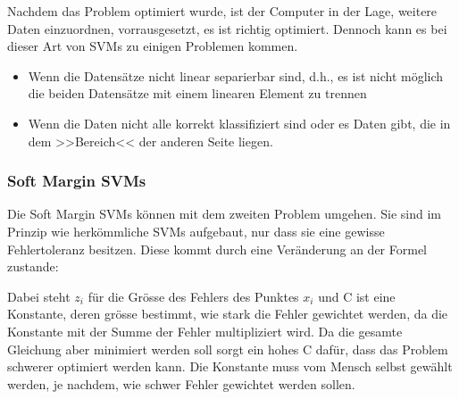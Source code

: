 Nachdem das Problem optimiert wurde, ist der Computer in der Lage, weitere Daten einzuordnen, vorrausgesetzt, es ist richtig optimiert.
Dennoch kann es bei dieser Art von SVMs zu einigen Problemen kommen.\\

\begin{itemize}
	\item Wenn die Datensätze nicht linear separierbar sind, d.h., es ist nicht möglich die beiden Datensätze mit einem linearen Element zu trennen\\
	
	\item Wenn die Daten nicht alle korrekt klassifiziert sind oder es Daten gibt, die in dem >>Bereich<< der anderen Seite liegen.
\end{itemize}

\subsubsection{Soft Margin SVMs}
Die Soft Margin SVMs können mit dem zweiten Problem umgehen.
Sie sind im Prinzip wie herkömmliche SVMs aufgebaut, nur dass sie eine gewisse Fehlertoleranz besitzen. Diese kommt durch eine Veränderung an der Formel zustande:


Dabei steht $z_{i}$ für die Grösse des Fehlers des Punktes $x_{i}$ und C ist eine Konstante, deren grösse bestimmt, wie stark die Fehler gewichtet werden, da die Konstante mit der Summe der Fehler multipliziert wird. Da die gesamte Gleichung aber minimiert werden soll sorgt ein hohes C dafür, dass das Problem schwerer optimiert werden kann. Die Konstante muss vom Mensch selbst gewählt werden, je nachdem, wie schwer Fehler gewichtet werden sollen.

